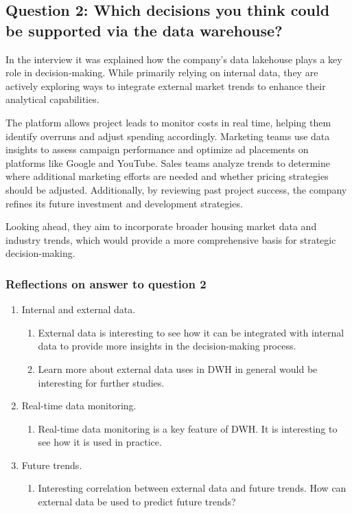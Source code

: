 \subsection{Question 2: Which decisions you think could be supported via the data warehouse?}

In the interview it was explained how the company's data lakehouse plays a key role in decision-making. While primarily relying on 
internal data, they are actively exploring ways to integrate external market trends to enhance their analytical capabilities.

The platform allows project leads to monitor costs in real time, helping them identify overruns and adjust spending accordingly. 
Marketing teams use data insights to assess campaign performance and optimize ad placements on platforms like Google and YouTube. 
Sales teams analyze trends to determine where additional marketing efforts are needed and whether pricing strategies should be adjusted. 
Additionally, by reviewing past project success, the company refines its future investment and development strategies.

Looking ahead, they aim to incorporate broader housing market data and industry trends, which would provide a more comprehensive basis 
for strategic decision-making.
\subsubsection{Reflections on answer to question 2}
\begin{enumerate}
    \item Internal and external data.
    \begin{enumerate}
        \item External data is interesting to see how it can be integrated with internal data to provide more insights in the decision-making process.
        \item Learn more about external data uses in DWH in general would be interesting for further studies.
    \end{enumerate}
    \item Real-time data monitoring.
    \begin{enumerate}
        \item Real-time data monitoring is a key feature of DWH. It is interesting to see how it is used in practice.
    \end{enumerate}
    \item Future trends.
    \begin{enumerate}
        \item Interesting correlation between external data and future trends. How can external data be used to predict future trends?
    \end{enumerate}
\end{enumerate}
